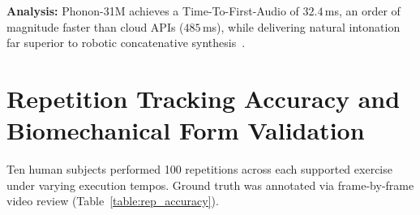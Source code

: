\documentclass[12pt]{report}
\begin{document}
\begin{table}[htbp]
    \centering
    \caption{Speech Synthesizer Latency}
    \label{table:voice_benchmarks}
    \footnotesize
\end{table}

\textbf{Analysis:} Phonon-31M achieves a Time-To-First-Audio of $32.4$\,ms, an order of magnitude faster than cloud APIs ($485$\,ms), while delivering natural intonation far superior to robotic concatenative synthesis~\cite{ren2021fastspeech2}.

\section{Repetition Tracking Accuracy and Biomechanical Form Validation}
Ten human subjects performed 100 repetitions across each supported exercise under varying execution tempos. Ground truth was annotated via frame-by-frame video review (Table~\ref{table:rep_accuracy}).

\begin{table}[htbp]
    \centering
    \caption{Repetition and Fault Detection Metrics}
    \label{table:rep_accuracy}
    \footnotesize
\end{table}
\end{document}
